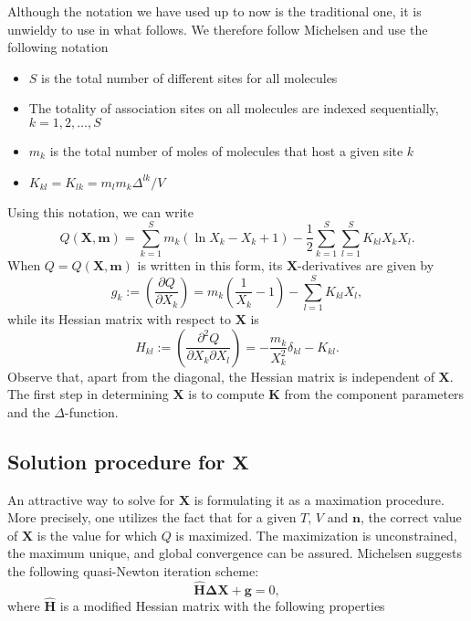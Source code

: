 \documentclass[10pt, a4paper]{article}
\newcommand{\mbf}[0]{\mathbf}
\newcommand*{\pder}[2]{\left(\frac{\partial #1}{\partial #2}\right)}
\newcommand*{\pdcross}[3]{\left(\frac{\partial^2 #1}{\partial #2 \partial #3}\right)}
\newcommand{\lp}{\left(}
\newcommand{\rp}{\right)}
\begin{document}
Although the notation we have used up to now is the traditional one, it is unwieldy to use in what follows. We therefore follow Michelsen \cite{Michelsen06} and use the following notation
\begin{itemize}
\item $S$ is the total number of different sites for all molecules
\item The totality of association sites on all molecules are indexed sequentially, $k=1,2,\ldots,S$
\item $m_k$ is the total number of moles of molecules that host a given site $k$
\item $K_{kl} = K_{lk} = m_l m_k \Delta^{lk}/V$
\end{itemize}
Using this notation, we can write
\begin{equation}
  Q(\mbf X, \mbf m) = \sum_{k=1}^S m_k(\ln X_k - X_k + 1) - \frac{1}{2} \sum_{k=1}^S \sum_{l=1}^S K_{kl} X_k X_l.
\end{equation}
When $Q = Q(\mbf X,\mbf m)$ is written in this form, its $\mbf X$-derivatives are given by
\begin{equation}
  \label{gDef}
  g_k := \pder{Q}{X_k} = m_k\lp \frac{1}{X_k} - 1 \rp - \sum_{l=1}^S K_{kl} X_l,
\end{equation}
while its Hessian matrix with respect to $\mbf X$ is
\begin{equation}
  \label{hDef}
  H_{kl} := \pdcross{Q}{X_k}{X_l} = - \frac{m_k}{X_k^2} \delta_{kl} - K_{kl}.
\end{equation}
Observe that, apart from the diagonal, the Hessian matrix is independent of $\mbf X$. The first step in determining $\mbf X$ is to compute $\mbf K$ from the component parameters and the $\Delta$-function.

\subsection{Solution procedure for $\mbf X$}
An attractive way to solve for $\mbf X$ is formulating it as a maximation procedure. More precisely, one utilizes the fact that for a given $T$, $V$ and $\mbf n$, the correct value of $\mbf X$ is the value for which $Q$ is maximized. The maximization is unconstrained, the maximum unique, and global convergence can be assured. Michelsen \cite{Michelsen06} suggests the following quasi-Newton iteration scheme:
\begin{equation}
  \label{quasiNewtonIteration}
  \mbf{\hat H \Delta X} + \mbf g = 0,
\end{equation}
where $\mbf{\hat H}$ is a modified Hessian matrix with the following properties
\end{document}
